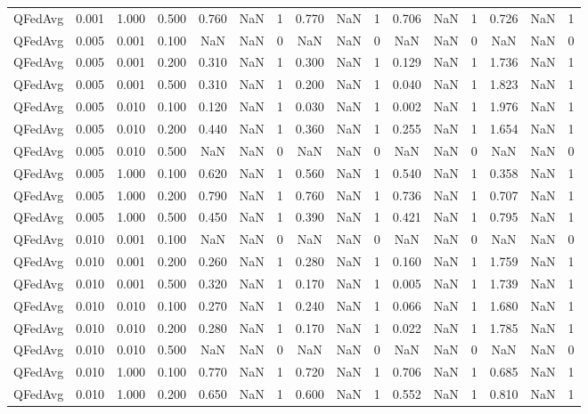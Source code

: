 \begin{table}[htbp]
\begin{tabular}{lccccccccccccccc}
QFedAvg & 0.001 & 1.000 & 0.500 & 0.760 & NaN & 1 & 0.770 & NaN & 1 & 0.706 & NaN & 1 & 0.726 & NaN & 1 \\
QFedAvg & 0.005 & 0.001 & 0.100 & NaN & NaN & 0 & NaN & NaN & 0 & NaN & NaN & 0 & NaN & NaN & 0 \\
QFedAvg & 0.005 & 0.001 & 0.200 & 0.310 & NaN & 1 & 0.300 & NaN & 1 & 0.129 & NaN & 1 & 1.736 & NaN & 1 \\
QFedAvg & 0.005 & 0.001 & 0.500 & 0.310 & NaN & 1 & 0.200 & NaN & 1 & 0.040 & NaN & 1 & 1.823 & NaN & 1 \\
QFedAvg & 0.005 & 0.010 & 0.100 & 0.120 & NaN & 1 & 0.030 & NaN & 1 & 0.002 & NaN & 1 & 1.976 & NaN & 1 \\
QFedAvg & 0.005 & 0.010 & 0.200 & 0.440 & NaN & 1 & 0.360 & NaN & 1 & 0.255 & NaN & 1 & 1.654 & NaN & 1 \\
QFedAvg & 0.005 & 0.010 & 0.500 & NaN & NaN & 0 & NaN & NaN & 0 & NaN & NaN & 0 & NaN & NaN & 0 \\
QFedAvg & 0.005 & 1.000 & 0.100 & 0.620 & NaN & 1 & 0.560 & NaN & 1 & 0.540 & NaN & 1 & 0.358 & NaN & 1 \\
QFedAvg & 0.005 & 1.000 & 0.200 & 0.790 & NaN & 1 & 0.760 & NaN & 1 & 0.736 & NaN & 1 & 0.707 & NaN & 1 \\
QFedAvg & 0.005 & 1.000 & 0.500 & 0.450 & NaN & 1 & 0.390 & NaN & 1 & 0.421 & NaN & 1 & 0.795 & NaN & 1 \\
QFedAvg & 0.010 & 0.001 & 0.100 & NaN & NaN & 0 & NaN & NaN & 0 & NaN & NaN & 0 & NaN & NaN & 0 \\
QFedAvg & 0.010 & 0.001 & 0.200 & 0.260 & NaN & 1 & 0.280 & NaN & 1 & 0.160 & NaN & 1 & 1.759 & NaN & 1 \\
QFedAvg & 0.010 & 0.001 & 0.500 & 0.320 & NaN & 1 & 0.170 & NaN & 1 & 0.005 & NaN & 1 & 1.739 & NaN & 1 \\
QFedAvg & 0.010 & 0.010 & 0.100 & 0.270 & NaN & 1 & 0.240 & NaN & 1 & 0.066 & NaN & 1 & 1.680 & NaN & 1 \\
QFedAvg & 0.010 & 0.010 & 0.200 & 0.280 & NaN & 1 & 0.170 & NaN & 1 & 0.022 & NaN & 1 & 1.785 & NaN & 1 \\
QFedAvg & 0.010 & 0.010 & 0.500 & NaN & NaN & 0 & NaN & NaN & 0 & NaN & NaN & 0 & NaN & NaN & 0 \\
QFedAvg & 0.010 & 1.000 & 0.100 & 0.770 & NaN & 1 & 0.720 & NaN & 1 & 0.706 & NaN & 1 & 0.685 & NaN & 1 \\
QFedAvg & 0.010 & 1.000 & 0.200 & 0.650 & NaN & 1 & 0.600 & NaN & 1 & 0.552 & NaN & 1 & 0.810 & NaN & 1 \\

\end{tabular}
\end{table}
